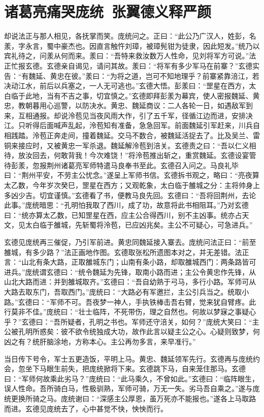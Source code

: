 \chapter{诸葛亮痛哭庞统~张翼德义释严颜}

却说法正与那人相见，各抚掌而笑。庞统问之。正曰：“此公乃广汉人，姓彭，名羕，字永言，蜀中豪杰也。因直言触忤刘璋，被璋髡钳为徒隶，因此短发。”统乃以宾礼待之，问羕从何而来。羕曰：“吾特来救汝数万人性命，见刘将军方可说。”法正忙报玄德。玄德亲自谒见，请问其故。羕曰：“将军有多少军马在前寨？”玄德实告：“有魏延、黄忠在彼。”羕曰：“为将之道，岂可不知地理乎？前寨紧靠涪江，若决动江水，前后以兵塞之，一人无可逃也。”玄德大悟。彭羕曰：“罡星在西方，太白临于此地，当有不吉之事，切宜慎之。”玄德即拜彭羕为幕宾，使人密报魏延、黄忠，教朝暮用心巡警，以防决水。黄忠、魏延商议：二人各轮一日，如遇敌军到来，互相通报。却说泠苞见当夜风雨大作，引了五千军，径循江边而进，安排决江。只听得后面喊声乱起，泠苞知有准备，急急回军。前面魏延引军赶来，川兵自相践踏。泠苞正奔走间，撞着魏延。交马不数合，被魏延活捉去了。比及吴兰、雷铜来接应时，又被黄忠一军杀退。魏延解泠苞到涪关。玄德责之曰：“吾以仁义相待，放汝回去，何敢背我！今次难饶！”将泠苞推出斩之，重赏魏延。玄德设宴管待彭羕，忽报荆州诸葛亮军师特遣马良奉书至此。玄德召入问之。马良礼毕曰：“荆州平安，不劳主公忧念。”遂呈上军师书信。玄德拆书观之，略曰：“亮夜算太乙数，今年岁次癸巳，罡星在西方；又观乾象，太白临于雒城之分：主将帅身上多凶少吉。切宜谨慎。”玄德看了书，便教马良先回。玄德曰：“吾将回荆州，去论此事。”庞统暗思：“孔明怕我取了西川，成了功，故意将此书相阻耳。”乃对玄德曰：“统亦算太乙数，已知罡星在西，应主公合得西川，别不主凶事。统亦占天文，见太白临于雒城，先斩蜀将泠苞，已应凶兆矣。主公不可疑心，可急进兵。”

玄德见庞统再三催促，乃引军前进。黄忠同魏延接入寨去。庞统问法正曰：“前至雒城，有多少路？”法正画地作图。玄德取张松所遗图本对之，并无差错。法正言：“山北有条大路，正取雒城东门；山南有条小路，却取雒城西门：两条路皆可进兵。”庞统谓玄德曰：“统令魏延为先锋，取南小路而进；主公令黄忠作先锋，从山北大路而进：并到雒城取齐。”玄德曰：“吾自幼熟于弓马，多行小路。军师可从大路去取东门，吾取西门。”庞统曰：“大路必有军邀拦，主公引兵当之。统取小路。”玄德曰：“军师不可。吾夜梦一神人，手执铁棒击吾右臂，觉来犹自臂疼。此行莫非不佳。”庞统曰：“壮士临阵，不死带伤，理之自然也。何故以梦寐之事疑心乎？”玄德曰：“吾所疑者，孔明之书也。军师还守涪关，如何？”庞统大笑曰：“主公被孔明所惑矣：彼不欲令统独成大功，故作此言以疑主公之心。心疑则致梦，何凶之有？统肝脑涂地，方称本心。主公再勿多言，来早准行。”

当日传下号令，军士五更造饭，平明上马。黄忠、魏延领军先行。玄德再与庞统约会，忽坐下马眼生前失，把庞统掀将下来。玄德跳下马，自来笼住那马。玄德曰：“军师何故乘此劣马？”庞统曰：“此马乘久，不曾如此。”玄德曰：“临阵眼生，误人性命。吾所骑白马，性极驯熟，军师可骑，万无一失。劣马吾自乘之。”遂与庞统更换所骑之马。庞统谢曰：“深感主公厚恩，虽万死亦不能报也。”遂各上马取路而进。玄德见庞统去了，心中甚觉不快，怏怏而行。

